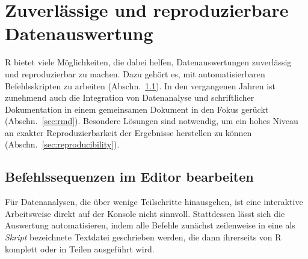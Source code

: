 \chapter{Zuverlässige und reproduzierbare Datenauswertung}
\label{sec:manage}

R bietet viele Möglichkeiten, die dabei helfen, Datenauswertungen zuverlässig und reproduzierbar zu machen. Dazu gehört es, mit automatisierbaren Befehlsskripten zu arbeiten (Abschn.\ \ref{sec:scripting}). In den vergangenen Jahren ist zunehmend auch die Integration von Datenanalyse und schriftlicher Dokumentation in einem gemeinsamen Dokument in den Fokus gerückt (Abschn.\ \ref{sec:rmd}). Besondere Lösungen sind notwendig, um ein hohes Niveau an exakter Reproduzierbarkeit der Ergebnisse herstellen zu können (Abschn.\ \ref{sec:reproducibility}).

\section{Befehlssequenzen im Editor bearbeiten}
\label{sec:scripting}

Für Datenanalysen, die über wenige Teilschritte hinausgehen, ist eine interaktive Arbeitsweise direkt auf der Konsole nicht sinnvoll. Stattdessen lässt sich die Auswertung automatisieren, indem alle Befehle zunächst zeilenweise in eine als \emph{Skript} bezeichnete Textdatei geschrieben werden, die dann ihrerseits von R komplett oder in Teilen ausgeführt wird.

